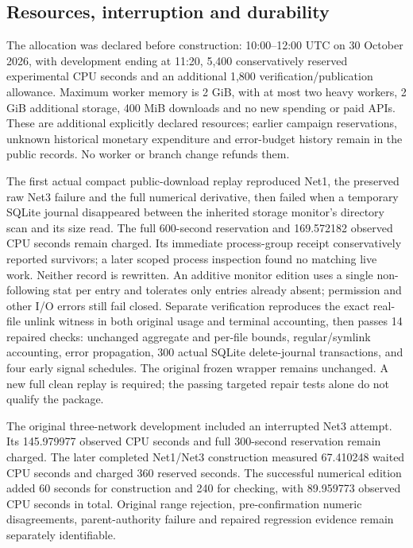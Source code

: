 \documentclass[
  11pt,
]{article}
\begin{document}
\hypertarget{resources-interruption-and-durability}{%
\subsection{Resources, interruption and
durability}\label{resources-interruption-and-durability}}

The allocation was declared before construction: 10:00--12:00 UTC on 30
October 2026, with development ending at 11:20, 5,400 conservatively
reserved experimental CPU seconds and an additional 1,800
verification/publication allowance. Maximum worker memory is 2 GiB, with
at most two heavy workers, 2 GiB additional storage, 400 MiB downloads
and no new spending or paid APIs. These are additional explicitly
declared resources; earlier campaign reservations, unknown historical
monetary expenditure and error-budget history remain in the public
records. No worker or branch change refunds them.

The first actual compact public-download replay reproduced Net1, the
preserved raw Net3 failure and the full numerical derivative, then
failed when a temporary SQLite journal disappeared between the inherited
storage monitor's directory scan and its size read. The full 600-second
reservation and 169.572182 observed CPU seconds remain charged. Its
immediate process-group receipt conservatively reported survivors; a
later scoped process inspection found no matching live work. Neither
record is rewritten. An additive monitor edition uses a single
non-following stat per entry and tolerates only entries already absent;
permission and other I/O errors still fail closed. Separate verification
reproduces the exact real-file unlink witness in both original usage and
terminal accounting, then passes 14 repaired checks: unchanged aggregate
and per-file bounds, regular/symlink accounting, error propagation, 300
actual SQLite delete-journal transactions, and four early signal
schedules. The original frozen wrapper remains unchanged. A new full
clean replay is required; the passing targeted repair tests alone do not
qualify the package.

The original three-network development included an interrupted Net3
attempt. Its 145.979977 observed CPU seconds and full 300-second
reservation remain charged. The later completed Net1/Net3 construction
measured 67.410248 waited CPU seconds and charged 360 reserved seconds.
The successful numerical edition added 60 seconds for construction and
240 for checking, with 89.959773 observed CPU seconds in total. Original
range rejection, pre-confirmation numeric disagreements,
parent-authority failure and repaired regression evidence remain
separately identifiable.
\end{document}

